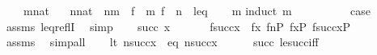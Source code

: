 \begin{isabellebody}
\ \ \ \ {\isachardoublequoteopen}m{\isasymin}nat{\isachardoublequoteclose}\isanewline
\ \ \ {\isachardoublequoteopen}n{\isasymin}nat\ {\isasymLongrightarrow}\ n{\isasymle}m\ {\isasymLongrightarrow}\ {\isasymlangle}f\ {\isacharbackquote}{\kern0pt}\ m{\isacharcomma}{\kern0pt}\ f\ {\isacharbackquote}{\kern0pt}\ n{\isasymrangle}\ {\isasymin}\ leq{\isachardoublequoteclose}\isanewline
%
\isadelimproof
\ \ %
\endisadelimproof
%
\isatagproof
{}\isamarkupfalse%
\ {\isacartoucheopen}m{\isasymin}{\isacharunderscore}{\kern0pt}{\isacartoucheclose}\isanewline
{}\isamarkupfalse%
{\isacharparenleft}{\kern0pt}induct\ m{\isacharparenright}{\kern0pt}\isanewline
\ \ \isamarkupfalse%
\ {}\isanewline
\ \ \isamarkupfalse%
\ \isamarkupfalse%
\ {\isacharquery}{\kern0pt}case\ \isamarkupfalse%
\ assms\ leq{\isacharunderscore}{\kern0pt}reflI\ \isamarkupfalse%
\ simp\isanewline
{}\isamarkupfalse%
\isanewline
\ \ \isamarkupfalse%
\ {\isacharparenleft}{\kern0pt}succ\ x{\isacharparenright}{\kern0pt}\isanewline
\ \ \isamarkupfalse%
\isanewline
\ \ \isamarkupfalse%
\ {}{\isacharcolon}{\kern0pt}{\isachardoublequoteopen}f{\isacharbackquote}{\kern0pt}succ{\isacharparenleft}{\kern0pt}x{\isacharparenright}{\kern0pt}\ {\isasympreceq}\ f{\isacharbackquote}{\kern0pt}x{\isachardoublequoteclose}\ {\isachardoublequoteopen}f{\isacharbackquote}{\kern0pt}n{\isasymin}P{\isachardoublequoteclose}\ {\isachardoublequoteopen}f{\isacharbackquote}{\kern0pt}x{\isasymin}P{\isachardoublequoteclose}\ {\isachardoublequoteopen}f{\isacharbackquote}{\kern0pt}succ{\isacharparenleft}{\kern0pt}x{\isacharparenright}{\kern0pt}{\isasymin}P{\isachardoublequoteclose}\isanewline
\ \ \ \ \isamarkupfalse%
\ assms\ \isamarkupfalse%
\ simp{\isacharunderscore}{\kern0pt}all\isanewline
\ \ \isamarkupfalse%
\ {\isacharparenleft}{\kern0pt}lt{\isacharparenright}{\kern0pt}\ {\isachardoublequoteopen}n{\isacharless}{\kern0pt}succ{\isacharparenleft}{\kern0pt}x{\isacharparenright}{\kern0pt}{\isachardoublequoteclose}\ {\isacharbar}{\kern0pt}\ {\isacharparenleft}{\kern0pt}eq{\isacharparenright}{\kern0pt}\ {\isachardoublequoteopen}n{\isacharequal}{\kern0pt}succ{\isacharparenleft}{\kern0pt}x{\isacharparenright}{\kern0pt}{\isachardoublequoteclose}\isanewline
\ \ \ \ \isamarkupfalse%
\ succ\ le{\isacharunderscore}{\kern0pt}succ{\isacharunderscore}{\kern0pt}iff\ \isamarkupfalse%

\end{isabellebody}
